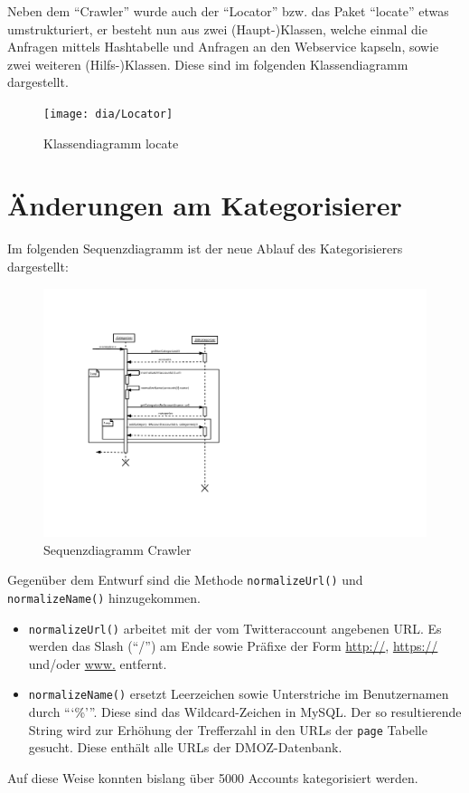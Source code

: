 Neben dem "`Crawler"' wurde auch der "`Locator"' bzw. das Paket "`locate"' etwas umstrukturiert, er besteht nun aus zwei (Haupt-)Klassen, welche einmal die Anfragen mittels Hashtabelle und Anfragen an den Webservice kapseln, sowie zwei weiteren (Hilfs-)Klassen. Diese sind im folgenden Klassendiagramm dargestellt.
 \begin{figure}[H]
 	\centering
 	\texttt{[image: dia/Locator]}
 	\caption{Klassendiagramm locate}
 	\label{fig:locate}
 \end{figure}

\section{Änderungen am Kategorisierer}
Im folgenden Sequenzdiagramm ist der neue Ablauf des Kategorisierers dargestellt:
\begin{figure}[H]
	\centering
	\includegraphics[width=\textwidth,height=\textheight,keepaspectratio=true]{dia/categorizerSequence}
	\caption{Sequenzdiagramm Crawler}
	\label{fig:Crawler}
\end{figure}
Gegenüber dem Entwurf sind die Methode \lstinline{normalizeUrl()} und \lstinline{normalizeName()} hinzugekommen.
\begin{itemize}
	\item \lstinline{normalizeUrl()} arbeitet mit der vom Twitteraccount angebenen URL. Es werden das Slash ("`/"') am Ende sowie Präfixe der Form \url{http://}, \url{https://} und/oder \url{www.} entfernt.
	\item \lstinline{normalizeName()} ersetzt Leerzeichen sowie Unterstriche im Benutzernamen durch ```\%'''. Diese sind das Wildcard-Zeichen in MySQL. Der so resultierende String wird zur Erhöhung der Trefferzahl in den URLs der \lstinline{page} Tabelle gesucht. Diese enthält alle URLs der DMOZ-Datenbank.
\end{itemize}
Auf diese Weise konnten bislang über 5000 Accounts kategorisiert werden.

